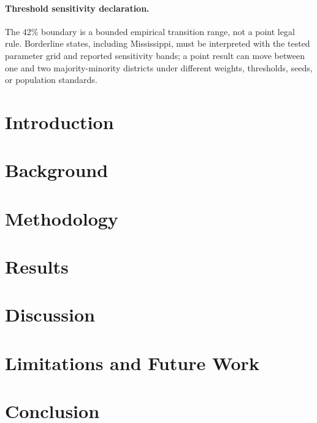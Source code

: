 \documentclass[12pt]{article}
\begin{document}
\paragraph{Threshold sensitivity declaration.} The 42\% boundary is a bounded empirical transition range, not a point legal rule. Borderline states, including Mississippi, must be interpreted with the tested parameter grid and reported sensitivity bands; a point result can move between one and two majority-minority districts under different weights, thresholds, seeds, or population standards.

\section{Introduction}


\section{Background}


\section{Methodology}


\section{Results}


\section{Discussion}


\section{Limitations and Future Work}


\section{Conclusion}




\end{document}
